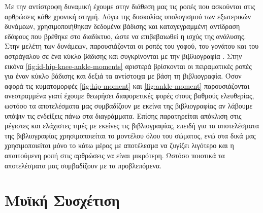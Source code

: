 Με την αντίστροφη δυναμική έχουμε στην διάθεση μας τις ροπές που ασκούνται στις αρθρώσεις κάθε χρονική στιγμή. Λόγω της δυσκολίας υπολογισμού των εξωτερικών δυνάμεων, χρησιμοποιήθηκαν δεδομένα βάδισης και καταγεγραμμένη αντίδραση εδάφους που βρέθηκε στο διαδίκτυο, ώστε να επιβεβαιωθεί η ισχύς της ανάλυσης. Στην μελέτη των δυνάμεων, παρουσιάζονται οι ροπές του γοφού, του γονάτου και του αστράγαλου σε ένα κύκλο βάδισης και συγκρίνονται με την βιβλιογραφία \cite{whittlesey}. Στην εικόνα \ref{fig:id-hip-knee-ankle-moments} αριστερά βρίσκονται οι πειραματικές ροπές για έναν κύκλο βάδισης και δεξιά τα αντίστοιχα με βάση τη βιβλιογραφία. Όσον αφορά τις κυματομορφές \ref{fig:hip-moment} και \ref{fig:ankle-moment} παρουσιάζονται ανεστραμμένα  γιατί έχουμε θεωρήσει διαφορετικές φορές στους βαθμούς ελευθερίας, ωστόσο τα αποτελέσματα μας συμβαδίζουν με εκείνα της βιβλιογραφίας αν λάβουμε υπόψιν τις ενδείξεις πάνω στα διαγράμματα. Επίσης παρατηρείται απόκλιση στις μέγιστες και ελάχιστες τιμές με εκείνες τις βιβλιογραφίας, επειδή για τα αποτελέσματα της βιβλιογραφίας χρησιμοποιείται το μοντέλου όλου του σώματος, ενώ στα δικά μας χρησιμοποιείται μόνο το κάτω μέρος με αποτέλεσμα να ζυγίζει λιγότερο και η απαιτούμενη ροπή στις αρθρώσεις να είναι μικρότερη. Ωστόσο ποιοτικά τα αποτελέσματα μας συμβαδίζουν με τα προβλεπόμενα.


\section{Μυϊκή Συσχέτιση}

